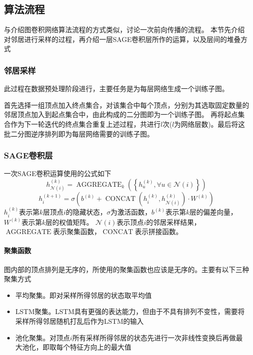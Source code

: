 \subsection{算法流程}
与介绍图卷积网络算法流程的方式类似，讨论一次前向传播的流程。
本节先介绍对邻居进行采样的过程，再介绍一层SAGE卷积层所作的运算，以及层间的堆叠方式

\subsubsection{邻居采样}
此过程在数据预处理阶段进行，主要任务是为每层网络生成一个训练子图。

首先选择一组顶点加入终点集合，对该集合中每个顶点，分别为其选取固定数量的邻居顶点加入到起点集合中，由此构成的二分图即为一个训练子图。
再将起点集合作为下一轮迭代的终点集合重复上述过程，共进行$l$次($l$为网络层数)。最后将这批二分图逆序排列即为每层网络需要的训练子图。

\subsubsection{SAGE卷积层}
\begin{definition}
    一次SAGE卷积运算使用的公式如下
    \begin{equation}
        {h}_{\mathcal{N}(i)}^{(k)} = \operatorname{AGGREGATE}_{k}\left(\left\{{h}_{u}^{(k)}, \forall u \in \mathcal{N}(i)\right\}\right)
    \end{equation}
    \begin{equation}
        {h}_{i}^{(k+1)} = \sigma\left(b^{(k)} + \operatorname{CONCAT}\left({h}_{i}^{(k)}, {h}_{\mathcal{N}(i)}^{(k)}\right) \cdot {W}^{(k)}\right)
    \end{equation}
    $h^{(k)}_i$表示第$k$层顶点$i$的隐藏状态，$\sigma$为激活函数，$b^{(k)}$表示第$k$层的偏差向量，$W^{(k)}$表示第$k$层的权值矩阵。
    $\mathcal{N}(i)$表示顶点$i$的邻居采样结果，$\operatorname{AGGREGATE}$表示聚集函数，$\operatorname{CONCAT}$表示拼接函数。
\end{definition}

\paragraph{聚集函数}
图内部的顶点排列是无序的，所使用的聚集函数也应该是无序的。主要有以下三种聚集方式
\begin{itemize}
    \item 平均聚集。即对采样所得邻居的状态取平均值
    \item LSTM聚集。LSTM具有更强的表达能力，但由于不具有排列不变性，需要将采样所得邻居随机打乱后作为LSTM的输入
    \item 池化聚集。对顶点$i$所有采样所得邻居的状态先进行一次非线性变换后再做最大池化，即取每个特征方向上的最大值
\end{itemize}

